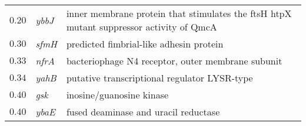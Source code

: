 \documentclass[letterpaper,10pt,english]{howto}
\begin{document}
\begin{threeparttable}
\begin{tabulary}{\textwidth}{|L|L|L|}
$0.20$
 & 
\emph{ybbJ}
 & 
inner membrane protein that stimulates the ftsH
htpX mutant suppressor activity of QmcA
\\

$0.30$
 & 
\emph{sfmH}
 & 
predicted fimbrial-like adhesin protein
\\

$0.33$
 & 
\emph{nfrA}
 & 
bacteriophage N4 receptor, outer membrane subunit
\\

$0.34$
 & 
\emph{yahB}
 & 
putative transcriptional regulator LYSR-type
\\

$0.40$
 & 
\emph{gsk}
 & 
inosine/guanosine kinase
\\

$0.40$
 & 
\emph{ybaE}
 & 
fused deaminase and uracil reductase
\\
\hline
\end{tabulary}

\end{threeparttable}
\end{document}

